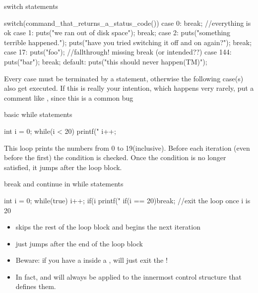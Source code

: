 \documentclass[10pt,graphics,aspectratio=169,table]{beamer}
\begin{document}
\begin{frame}[fragile]{switch statements}
    \begin{codeblock}
switch(command_that_returns_a_status_code()){
    case 0: break; //everything is ok
    case 1: puts("we ran out of disk space"); break;
    case 2: {
        puts("something terrible happened.");
        puts("have you tried switching it off and on again?");
    }break;
    case 17: puts("foo"); //fallthrough! missing break (or intended??)
    case 144: puts("bar"); break;
    default: puts("this should never happen(TM)");
}
    \end{codeblock}
    Every case must be terminated by a  statement, otherwise the 
    following case(s) also get executed. If this is really your intention,
    which happens very rarely, put a comment like , 
    since this is a common bug
\end{frame}

\begin{frame}[fragile]{basic while statements}
    \begin{codeblock}
int i = 0;
while(i < 20){
    printf("%
    i++;
}
    \end{codeblock}

    This loop prints the numbers from 0 to 19(inclusive).
    Before each iteration (even before the first) the condition is checked.
    Once the condition is no longer satisfied, it jumps after the loop block.
\end{frame}
\begin{frame}[fragile]{break and continue in while statements}
    \begin{codeblock}
int i = 0;
while(true){
    i++; 
    if(i %
    printf("%
    if(i == 20)break; //exit the loop once i is 20
}
    \end{codeblock} 
    \begin{itemize}
        \item
             skips the rest of the loop block and begins
            the next iteration
        \item {} just jumps after the end of the loop block
        \item 
            Beware: if you have a  inside a ,
             will just exit the !
        \item 
            In fact,  and  will always be applied to
            the innermost control structure that defines them. 
    \end{itemize}
\end{frame}
\end{document}

